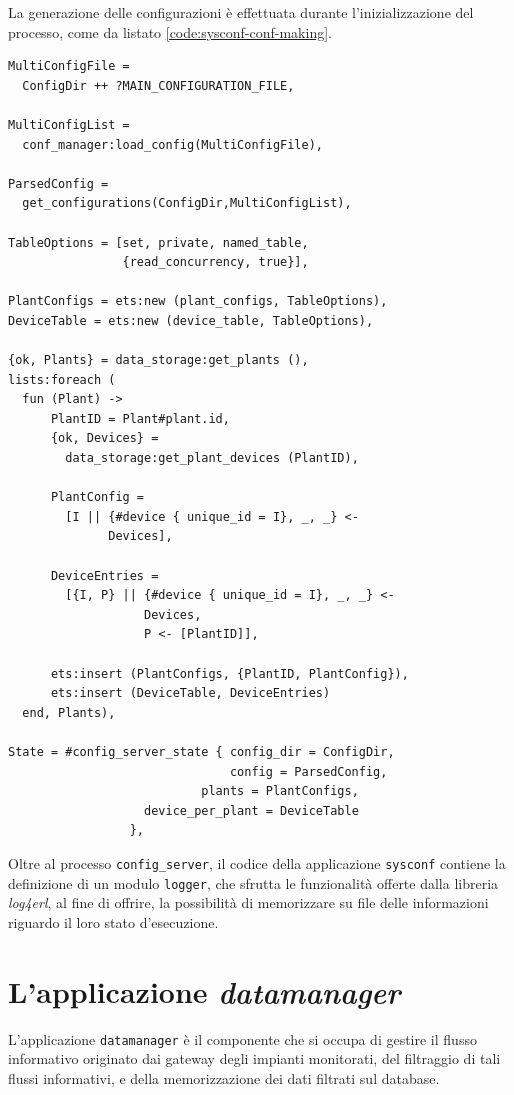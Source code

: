 %
La generazione delle configurazioni \`e effettuata durante l'inizializzazione del processo, 
come da listato \ref{code:sysconf-conf-making}.
%
\begin{lstlisting}[caption={Costruzione delle tabelle \texttt{plant} e \texttt{device\_per\_plant}}, label={code:sysconf-conf-making},frame=trBL]
MultiConfigFile = 
  ConfigDir ++ ?MAIN_CONFIGURATION_FILE,

MultiConfigList = 
  conf_manager:load_config(MultiConfigFile),

ParsedConfig = 
  get_configurations(ConfigDir,MultiConfigList),

TableOptions = [set, private, named_table, 
                {read_concurrency, true}],

PlantConfigs = ets:new (plant_configs, TableOptions),
DeviceTable = ets:new (device_table, TableOptions),
    
{ok, Plants} = data_storage:get_plants (),
lists:foreach (
  fun (Plant) ->
      PlantID = Plant#plant.id,
      {ok, Devices} = 
        data_storage:get_plant_devices (PlantID),

      PlantConfig = 
        [I || {#device { unique_id = I}, _, _} <- 
              Devices],

      DeviceEntries = 
        [{I, P} || {#device { unique_id = I}, _, _} <-
                   Devices,
                   P <- [PlantID]],
	      
      ets:insert (PlantConfigs, {PlantID, PlantConfig}),
      ets:insert (DeviceTable, DeviceEntries)
  end, Plants),

State = #config_server_state { config_dir = ConfigDir,
                               config = ParsedConfig,
     		               plants = PlantConfigs,
			       device_per_plant = DeviceTable
			     },
\end{lstlisting}
%

%
Oltre al processo \texttt{config\_server}, il codice della applicazione \texttt{sysconf}
contiene la definizione di un modulo \texttt{logger}, che sfrutta le funzionalit\`a
offerte dalla libreria \emph{log4erl}\cite{log4erl}, al fine di offrire, la possibilit\`a 
di memorizzare su file delle informazioni riguardo il loro stato d'esecuzione.
%

%
\section{L'applicazione \emph{datamanager}}
%
L'applicazione \texttt{datamanager} \`e il componente che si occupa di gestire il flusso 
informativo originato dai gateway degli impianti monitorati, del filtraggio di tali 
flussi informativi, e della memorizzazione dei dati filtrati sul database.
%

